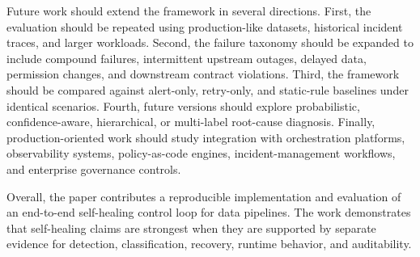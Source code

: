 Future work should extend the framework in several directions. First, the evaluation should be repeated using production-like datasets, historical incident traces, and larger workloads. Second, the failure taxonomy should be expanded to include compound failures, intermittent upstream outages, delayed data, permission changes, and downstream contract violations. Third, the framework should be compared against alert-only, retry-only, and static-rule baselines under identical scenarios. Fourth, future versions should explore probabilistic, confidence-aware, hierarchical, or multi-label root-cause diagnosis. Finally, production-oriented work should study integration with orchestration platforms, observability systems, policy-as-code engines, incident-management workflows, and enterprise governance controls.

Overall, the paper contributes a reproducible implementation and evaluation of an end-to-end self-healing control loop for data pipelines. The work demonstrates that self-healing claims are strongest when they are supported by separate evidence for detection, classification, recovery, runtime behavior, and auditability.

